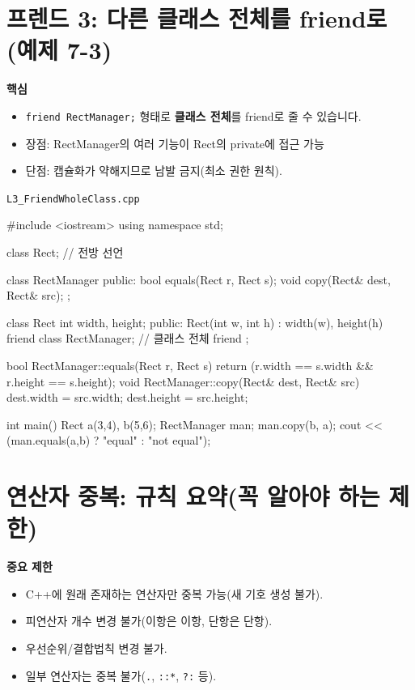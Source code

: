 \documentclass[11pt,a4paper]{article}
\newcommand{\filetag}[1]{\texttt{\color{Accent}#1}}
\begin{document}
\section{프렌드 3: 다른 클래스 전체를 friend로(예제 7-3)}
\begin{GoalBox}
\textbf{핵심}
\begin{itemize}[leftmargin=18pt]
  \item \texttt{friend RectManager;} 형태로 \textbf{클래스 전체}를 friend로 줄 수 있습니다.
  \item 장점: RectManager의 여러 기능이 Rect의 private에 접근 가능
  \item 단점: 캡슐화가 약해지므로 남발 금지(최소 권한 원칙).
\end{itemize}
\end{GoalBox}

\noindent\filetag{L3\_FriendWholeClass.cpp}
\begin{cppcode}
#include <iostream>
using namespace std;

class Rect; // 전방 선언

class RectManager {
public:
    bool equals(Rect r, Rect s);
    void copy(Rect& dest, Rect& src);
};

class Rect {
    int width, height;
public:
    Rect(int w, int h) : width(w), height(h) {}
    friend class RectManager; // 클래스 전체 friend
};

bool RectManager::equals(Rect r, Rect s) {
    return (r.width == s.width && r.height == s.height);
}
void RectManager::copy(Rect& dest, Rect& src) {
    dest.width = src.width;
    dest.height = src.height;
}

int main() {
    Rect a(3,4), b(5,6);
    RectManager man;
    man.copy(b, a);
    cout << (man.equals(a,b) ? "equal\n" : "not equal\n");
}
\end{cppcode}

\section{연산자 중복: 규칙 요약(꼭 알아야 하는 제한)}
\begin{GoalBox}
\textbf{중요 제한}
\begin{itemize}[leftmargin=18pt]
  \item C++에 원래 존재하는 연산자만 중복 가능(새 기호 생성 불가).
  \item 피연산자 개수 변경 불가(이항은 이항, 단항은 단항).
  \item 우선순위/결합법칙 변경 불가.
  \item 일부 연산자는 중복 불가(\texttt{.}, \texttt{::*}, \texttt{?:} 등).
\end{itemize}
\end{GoalBox}
\end{document}
